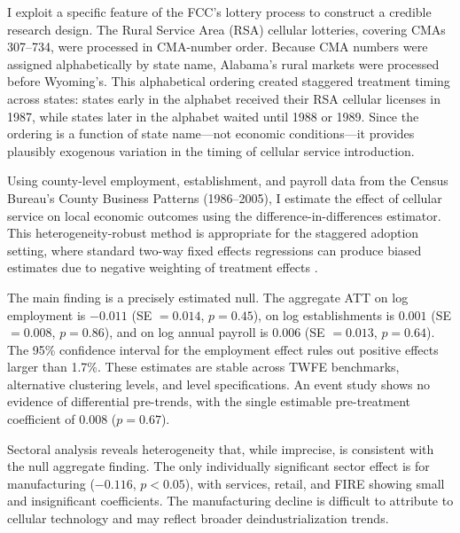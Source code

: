 \documentclass[12pt]{article}
\begin{document}
I exploit a specific feature of the FCC's lottery process to construct a credible research design. The Rural Service Area (RSA) cellular lotteries, covering CMAs 307--734, were processed in CMA-number order. Because CMA numbers were assigned alphabetically by state name, Alabama's rural markets were processed before Wyoming's. This alphabetical ordering created staggered treatment timing across states: states early in the alphabet received their RSA cellular licenses in 1987, while states later in the alphabet waited until 1988 or 1989. Since the ordering is a function of state name---not economic conditions---it provides plausibly exogenous variation in the timing of cellular service introduction.

Using county-level employment, establishment, and payroll data from the Census Bureau's County Business Patterns (1986--2005), I estimate the effect of cellular service on local economic outcomes using the \citet{callaway2021} difference-in-differences estimator. This heterogeneity-robust method is appropriate for the staggered adoption setting, where standard two-way fixed effects regressions can produce biased estimates due to negative weighting of treatment effects \citep{goodman2021, dechaisemartin2020}.

The main finding is a precisely estimated null. The aggregate ATT on log employment is $-0.011$ (SE $= 0.014$, $p = 0.45$), on log establishments is $0.001$ (SE $= 0.008$, $p = 0.86$), and on log annual payroll is $0.006$ (SE $= 0.013$, $p = 0.64$). The 95\% confidence interval for the employment effect rules out positive effects larger than 1.7\%. These estimates are stable across TWFE benchmarks, alternative clustering levels, and level specifications. An event study shows no evidence of differential pre-trends, with the single estimable pre-treatment coefficient of $0.008$ ($p = 0.67$).

Sectoral analysis reveals heterogeneity that, while imprecise, is consistent with the null aggregate finding. The only individually significant sector effect is for manufacturing ($-0.116$, $p < 0.05$), with services, retail, and FIRE showing small and insignificant coefficients. The manufacturing decline is difficult to attribute to cellular technology and may reflect broader deindustrialization trends.
\end{document}
